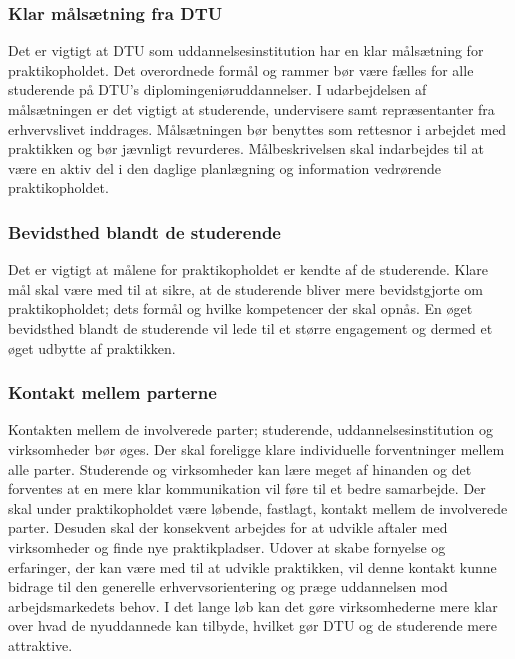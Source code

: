 \subsubsection{Klar målsætning fra DTU}
Det er vigtigt at DTU som uddannelsesinstitution har en klar målsætning for praktikopholdet. Det overordnede formål og rammer bør være fælles for alle studerende på DTU’s diplomingeniøruddannelser. I udarbejdelsen af målsætningen er det vigtigt at studerende, undervisere samt repræsentanter fra erhvervslivet inddrages. Målsætningen bør benyttes som rettesnor i arbejdet med praktikken og bør jævnligt revurderes. Målbeskrivelsen skal indarbejdes til at være en aktiv del i den daglige planlægning og information vedrørende praktikopholdet.

\subsubsection{Bevidsthed blandt de studerende}
Det er vigtigt at målene for praktikopholdet er kendte af de studerende. Klare mål skal være med til at sikre, at de studerende bliver mere bevidstgjorte om praktikopholdet; dets formål og hvilke kompetencer der skal opnås. En øget bevidsthed blandt de studerende vil lede til et større engagement og dermed et øget udbytte af praktikken.

\subsubsection{Kontakt mellem parterne}
Kontakten mellem de involverede parter; studerende, uddannelsesinstitution og virksomheder bør øges. Der skal foreligge klare individuelle forventninger mellem alle parter. Studerende og virksomheder kan lære meget af hinanden og det forventes at en mere klar kommunikation vil føre til et bedre samarbejde. Der skal under praktikopholdet være løbende, fastlagt, kontakt mellem de involverede parter. Desuden skal der konsekvent arbejdes for at udvikle aftaler med virksomheder og finde nye praktikpladser. Udover at skabe fornyelse og erfaringer, der kan være med til at udvikle praktikken, vil denne kontakt kunne bidrage til den generelle erhvervsorientering og præge uddannelsen mod arbejdsmarkedets behov. I det lange løb kan det gøre virksomhederne mere klar over hvad de nyuddannede kan tilbyde, hvilket gør DTU og de studerende mere attraktive.

